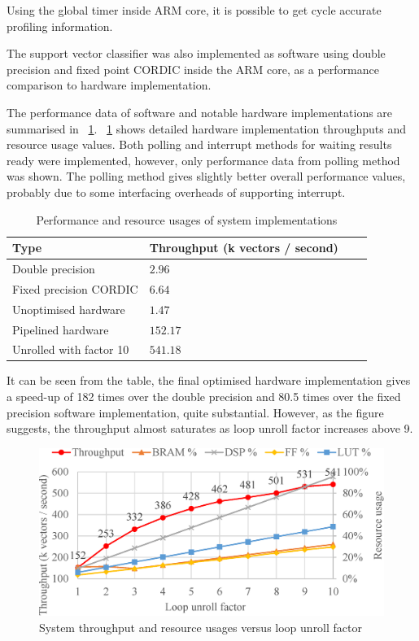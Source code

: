 \documentclass[journal]{IEEEtran}
\newcommand{\fref}[1]{\figurename~\ref{#1}}
\newcommand{\tref}[1]{\tablename~\ref{#1}}
\begin{document}
Using the global timer inside ARM core, it is possible to get cycle accurate profiling information.

The support vector classifier was also implemented as software using double precision and fixed point CORDIC inside the ARM core, as a performance comparison to hardware implementation.

The performance data of software and notable hardware implementations are summarised in \tref{tbl:throughput}. \fref{fig:throughput} shows detailed hardware implementation throughputs and resource usage values. Both polling and interrupt methods for waiting results ready were implemented, however, only performance data from polling method was shown. The polling method gives slightly better overall performance values, probably due to some interfacing overheads of supporting interrupt.

\begin{table}[ht]
	\renewcommand{\arraystretch}{1.3}
	\caption{Performance and resource usages of system implementations}
	\label{tbl:throughput}
	\centering
	\begin{tabular}{llll}
		\hline
		Type			& Throughput (k vectors / second)	\\
		\hline
		Double precision	& $2.96$	\\
		Fixed precision CORDIC	& $6.64$	\\
		\hline
		Unoptimised hardware	& $1.47$	\\
		Pipelined hardware	& $152.17$	\\
		Unrolled with factor 10	& $541.18$	\\
		\hline
	\end{tabular}
\end{table}

It can be seen from the table, the final optimised hardware implementation gives a speed-up of 182 times over the double precision and 80.5 times over the fixed precision software implementation, quite substantial. However, as the figure suggests, the throughput almost saturates as loop unroll factor increases above 9.

\begin{figure}[t]
	\centering
	\includegraphics[width=0.9\columnwidth]{throughput}
	\caption{System throughput and resource usages versus loop unroll factor}
	\label{fig:throughput}
\end{figure}
\end{document}

